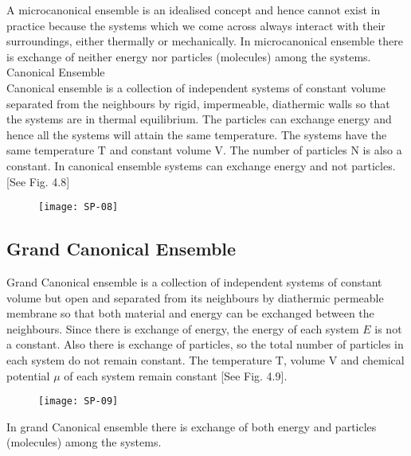 A microcanonical ensemble is an idealised concept and hence cannot exist in practice because the systems which we come across always interact with their surroundings, either thermally or mechanically.
In microcanonical ensemble there is exchange of neither energy nor particles (molecules) among the systems.
Canonical Ensemble\\
Canonical ensemble is a collection of independent systems of constant volume separated from the neighbours by rigid, impermeable, diathermic walls so that the systems are in thermal equilibrium. The particles can exchange energy and hence all the systems will attain the same temperature. The systems have the same temperature $\mathrm{T}$ and constant volume $\mathrm{V}$. The number of particles $\mathrm{N}$ is also a constant. In canonical ensemble systems can exchange energy and not particles. [See Fig. 4.8]
\begin{figure}[H]
	\centering
	\texttt{[image: SP-08]}
\end{figure}
\subsection{Grand Canonical Ensemble}
Grand Canonical ensemble is a collection of independent systems of constant volume but open and separated from its neighbours by diathermic permeable membrane so that both material and energy can be exchanged between the neighbours. Since there is exchange of energy, the energy of each system $E$ is not a constant. Also there is exchange of particles, so the total number of particles in each system do not remain constant. The temperature T, volume $\mathrm{V}$ and chemical potential $\mu$ of each system remain constant [See Fig. 4.9]. 
\begin{figure}[H]
	\centering
	\texttt{[image: SP-09]}
\end{figure}
In grand Canonical ensemble there is exchange of both energy and particles (molecules) among the systems.
